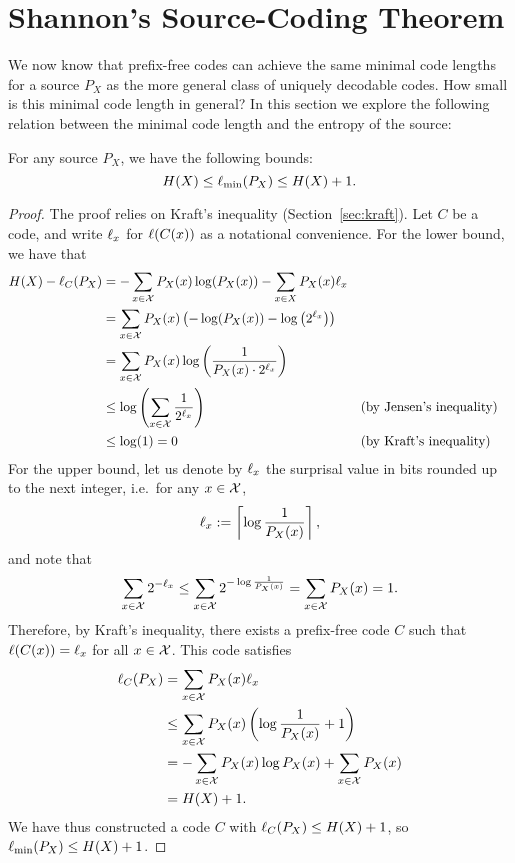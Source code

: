 \section{Shannon's Source-Coding Theorem} \label{sec:sourcecoding}
We now know that prefix-free codes can achieve the same minimal code lengths for a source $P_X$ as the more general class of uniquely decodable codes. How small is this minimal code length in general? In this section we explore the following relation between the minimal code length and the entropy of the source:
\begin{theorem}
For any source $P_X$, we have the following bounds:
\[
H(X) \leq \ell_{\min}(P_X) \leq H(X) + 1.
\]
\end{theorem}
\begin{proof}
The proof relies on Kraft's inequality (Section~\ref{sec:kraft}). Let $C$ be a code, and write $\ell_x$ for $\ell(C(x))$ as a notational convenience. For the lower bound, we have that
\begin{align}
H(X) - \ell_C(P_X) &= - \sum_{x \in {\cal X}} P_X(x) \log(P_X(x)) - \sum_{x \in X} P_X(x) \ell_x\nonumber\\
&=  \sum_{x \in {\cal X}} P_X(x) \left(-\log(P_X(x)) - \log\left(2^{\ell_x}\right)\right)\nonumber\\
&=  \sum_{x \in {\cal X}} P_X(x) \log \left(\frac{1}{P_X(x)\cdot 2^{\ell_x}}\right)\nonumber\\
&\leq \log\left(\sum_{x \in {\cal X}} \frac{1}{2^{\ell_x}}\right) &&\mbox{(by Jensen's inequality)}\nonumber\\
&\leq \log(1) = 0&&\mbox{(by Kraft's inequality)}
\end{align}
For the upper bound, let us denote by $\ell_x$ the surprisal value in bits rounded up to the next integer, i.e.\ for any $x \in {\cal X}$,
\begin{align}
\ell_x := \left\lceil\log\frac{1}{P_X(x)}\right\rceil,
\end{align}
and note that
\begin{align}
\sum_{x \in {\cal X}} 2^{-\ell_x} \leq \sum_{x \in {\cal X}} 2^{-\log\frac{1}{P_X(x)}} = \sum_{x \in {\cal X}} P_X(x) = 1.
\end{align}
Therefore, by Kraft's inequality, there exists a prefix-free code $C$ such that $\ell(C(x)) = \ell_x$ for all $x \in {\cal X}$. This code satisfies
\begin{align}
\ell_C(P_X) &= \sum_{x \in {\cal X}} P_X(x) \ell_x \nonumber\\
&\leq \sum_{x \in {\cal X}} P_X(x) \left(\log \frac{1}{P_X(x)} + 1 \right)\nonumber\\
&= -\sum_{x \in {\cal X}} P_X(x)\log P_X(x) + \sum_{x \in {\cal X}} P_X(x) \nonumber\\
&= H(X) + 1.
\end{align}
We have thus constructed a code $C$ with $\ell_C(P_X) \leq H(X) + 1$, so $\ell_{\min}(P_X) \leq H(X) + 1$.
\end{proof}

